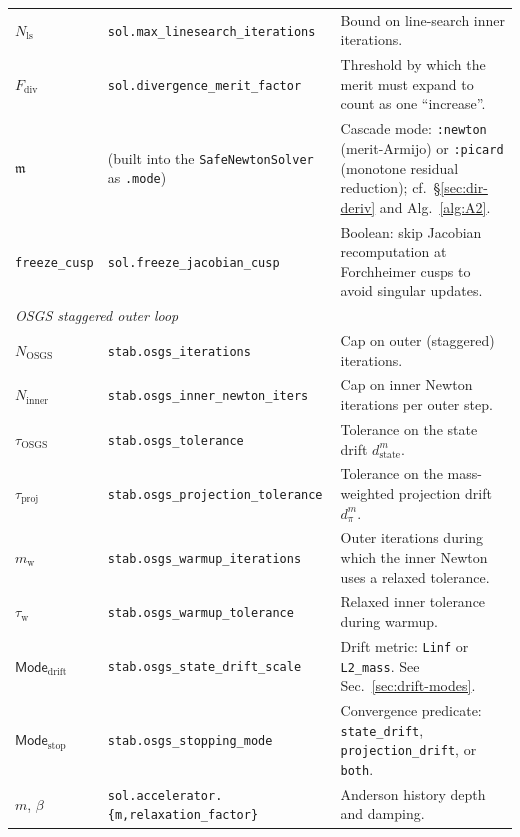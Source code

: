 \documentclass{article}
\newcommand{\code}[1]{\texttt{\small #1}}
\begin{document}
\begin{table}[h]
\begin{tabularx}{\textwidth}{@{} l l X @{}}
$N_{\mathrm{ls}}$        & \code{sol.max\_linesearch\_iterations}   & Bound on line-search inner iterations. \\
$F_{\mathrm{div}}$       & \code{sol.divergence\_merit\_factor}     & Threshold by which the merit must expand to count as one ``increase''. \\
$\mathfrak{m}$           & (built into the \code{SafeNewtonSolver} as \code{.mode})  & Cascade mode: \code{:newton} (merit-Armijo) or \code{:picard} (monotone residual reduction); cf.\ §\ref{sec:dir-deriv} and Alg.~\ref{alg:A2}. \\
\code{freeze\_cusp} & \code{sol.freeze\_jacobian\_cusp}   & Boolean: skip Jacobian recomputation at Forchheimer cusps to avoid singular updates. \\
\midrule
\multicolumn{3}{l}{\emph{OSGS staggered outer loop}} \\
$N_{\mathrm{OSGS}}$      & \code{stab.osgs\_iterations}             & Cap on outer (staggered) iterations. \\
$N_{\mathrm{inner}}$     & \code{stab.osgs\_inner\_newton\_iters}   & Cap on inner Newton iterations per outer step. \\
$\tau_{\mathrm{OSGS}}$   & \code{stab.osgs\_tolerance}              & Tolerance on the state drift $d_{\mathrm{state}}^m$. \\
$\tau_{\mathrm{proj}}$   & \code{stab.osgs\_projection\_tolerance}  & Tolerance on the mass-weighted projection drift $d_{\pi}^m$. \\
$m_{\mathrm{w}}$         & \code{stab.osgs\_warmup\_iterations}     & Outer iterations during which the inner Newton uses a relaxed tolerance. \\
$\tau_{\mathrm{w}}$      & \code{stab.osgs\_warmup\_tolerance}      & Relaxed inner tolerance during warmup. \\
$\mathsf{Mode}_{\mathrm{drift}}$ & \code{stab.osgs\_state\_drift\_scale} & Drift metric: \code{Linf} or \code{L2\_mass}. See Sec.~\ref{sec:drift-modes}. \\
$\mathsf{Mode}_{\mathrm{stop}}$  & \code{stab.osgs\_stopping\_mode}      & Convergence predicate: \code{state\_drift}, \code{projection\_drift}, or \code{both}. \\
$m$, $\beta$             & \code{sol.accelerator.\{m,relaxation\_factor\}} & Anderson history depth and damping. \\
\bottomrule
\end{tabularx}
\end{table}
\end{document}
